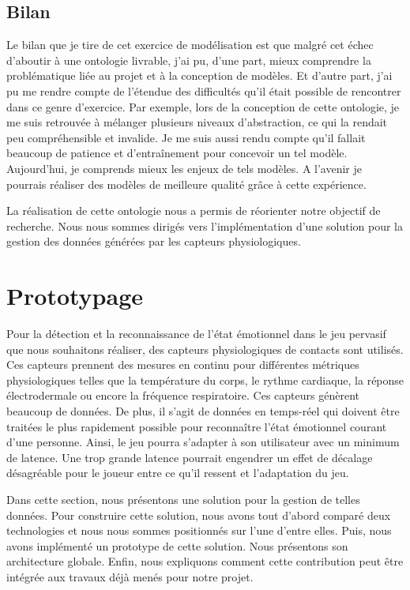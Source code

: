 \documentclass[11pt]{article}
\begin{document}
	\subsection{Bilan}\label{sec:modelbilan}
		Le bilan que je tire de cet exercice de modélisation est que malgré cet échec d'aboutir à une ontologie livrable, j'ai pu, d'une part, mieux comprendre la problématique liée au projet et à la conception de modèles.
		Et d'autre part, j'ai pu me rendre compte de l'étendue des difficultés qu'il  était possible de rencontrer dans ce genre d'exercice.
		Par exemple, lors de la conception de cette ontologie, je me suis retrouvée à mélanger plusieurs niveaux d'abstraction, ce qui la rendait peu compréhensible et invalide.
		Je me suis aussi rendu compte qu'il fallait beaucoup de patience et d'entraînement pour concevoir un tel modèle.
		Aujourd'hui, je comprends mieux les enjeux de tels modèles.
		A l'avenir je pourrais réaliser des modèles de meilleure qualité grâce à cette expérience.\par
		La réalisation de cette ontologie nous a permis de réorienter notre objectif de recherche.
		Nous nous sommes dirigés vers l'implémentation d'une solution pour la gestion des données générées par les capteurs physiologiques.

\section{Prototypage}\label{sec:prototypage}
	Pour la détection et la reconnaissance de l'état émotionnel dans le jeu pervasif que nous souhaitons réaliser, des  capteurs physiologiques de contacts sont utilisés.
	Ces capteurs prennent des mesures en continu pour différentes métriques physiologiques telles que la température du corps, le rythme cardiaque, la réponse électrodermale ou encore la fréquence respiratoire.
	Ces capteurs génèrent beaucoup de données.
	De plus, il s'agit de données en temps-réel qui doivent être traitées le plus rapidement possible pour reconnaître l'état émotionnel courant d'une personne. 
	Ainsi, le jeu pourra s'adapter à son utilisateur avec un minimum de latence. 
	Une trop grande latence pourrait engendrer un effet de décalage désagréable pour le joueur entre ce qu'il ressent et l'adaptation du jeu.\par
	Dans cette section, nous présentons une solution pour la gestion de telles données. 
	Pour construire cette solution, nous avons tout d'abord comparé deux technologies et nous nous sommes positionnés sur l'une d'entre elles.
	Puis, nous avons implémenté un prototype de cette solution.
	Nous présentons son architecture globale.
	Enfin, nous expliquons comment cette contribution peut être intégrée aux travaux déjà menés pour notre projet.
\end{document}
